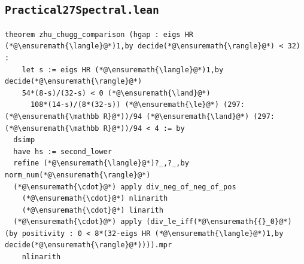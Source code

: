\subsection*{\texttt{Practical27Spectral.lean}}
\begin{lstlisting}
theorem zhu_chugg_comparison (hgap : eigs HR (*@\ensuremath{\langle}@*)1,by decide(*@\ensuremath{\rangle}@*) < 32) :
    let s := eigs HR (*@\ensuremath{\langle}@*)1,by decide(*@\ensuremath{\rangle}@*)
    54*(8-s)/(32-s) < 0 (*@\ensuremath{\land}@*)
      108*(14-s)/(8*(32-s)) (*@\ensuremath{\le}@*) (297:(*@\ensuremath{\mathbb R}@*))/94 (*@\ensuremath{\land}@*) (297:(*@\ensuremath{\mathbb R}@*))/94 < 4 := by
  dsimp
  have hs := second_lower
  refine (*@\ensuremath{\langle}@*)?_,?_,by norm_num(*@\ensuremath{\rangle}@*)
  (*@\ensuremath{\cdot}@*) apply div_neg_of_neg_of_pos
    (*@\ensuremath{\cdot}@*) nlinarith
    (*@\ensuremath{\cdot}@*) linarith
  (*@\ensuremath{\cdot}@*) apply (div_le_iff(*@\ensuremath{{}_0}@*) (by positivity : 0 < 8*(32-eigs HR (*@\ensuremath{\langle}@*)1,by decide(*@\ensuremath{\rangle}@*)))).mpr
    nlinarith
\end{lstlisting}
